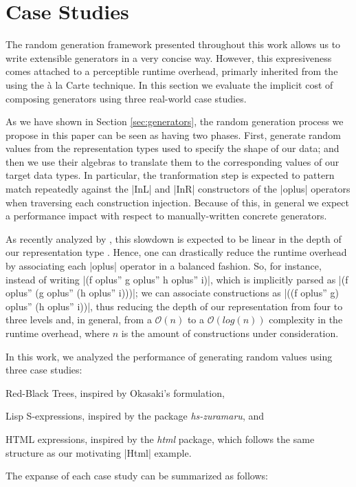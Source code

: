 \section{Case Studies}
\label{sec:casestudies}

The random generation framework presented throughout this work allows us to
write extensible generators in a very concise way.
%
However, this expresiveness comes attached to a perceptible runtime overhead,
primarly inherited from the using the \`a la Carte technique.
%
In this section we evaluate the implicit cost of composing generators using
three real-world case studies.


As we have shown in Section \ref{sec:generators}, the random generation
process we propose in this paper can be seen as having two phases.
%
First, generate random values from the representation types used to specify the
shape of our data; and then we use their algebras to translate them to the
corresponding values of our target data types.
%
In particular, the tranformation step is expected to pattern match repeatedly
against the |InL| and |InR| constructors of the |oplus| operators when
traversing each construction injection.
%
Because of this, in general we expect a performance impact with respect to
manually-written concrete generators.


As recently analyzed by \citeauthor{KiriyamaOptimizingDTC}, this slowdown is
expected to be linear in the depth of our representation type
\cite{KiriyamaOptimizingDTC}.
%
Hence, one can drastically reduce the runtime overhead by associating each
|oplus| operator in a balanced fashion.
%
So, for instance, instead of writing |(f oplus'' g oplus'' h oplus'' i)|, which
is implicitly parsed as |(f oplus'' (g oplus'' (h oplus'' i)))|; we can
associate constructions as |((f oplus'' g) oplus'' (h oplus'' i))|, thus
reducing the depth of our representation from four to three levels and, in
general, from a $\mathcal{O}(n)$ to a $\mathcal{O}(log(n))$ complexity in the
runtime overhead, where $n$ is the amount of constructions under consideration.


In this work, we analyzed the performance of generating random values using
three case studies:
%
\begin{inparaenum}[(i)]
\item Red-Black Trees, inspired by Okasaki's formulation,
\item Lisp S-expressions, inspired by the package \emph{hs-zuramaru}, and
\item HTML expressions, inspired by the \emph{html} package, which follows the
  same structure as our motivating |Html| example.
\end{inparaenum}
%
The expanse of each case study can be summarized as follows:

